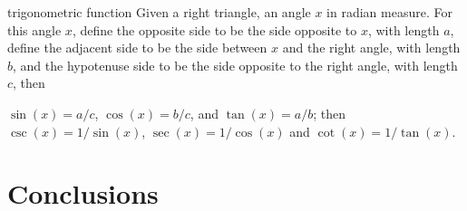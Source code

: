 \documentclass{article}
\begin{document}
\begin{myleftlinebox}
	trigonometric function
	\tcblower
	Given a right triangle, an angle $x$ in radian measure. For this angle $x$, define the opposite side to be the side opposite to $x$, with length $a$, define the adjacent side to be the side between $x$ and the right angle, with length $b$, and the hypotenuse side to be the side opposite to the right angle, with length $c$, then
	
	$\sin(x) = a/c$, $\cos(x)=b/c$, and $\tan(x) = a/b$; then $\csc(x)=1/\sin(x)$, $\sec(x)=1/\cos(x)$ and $\cot(x)=1/	\tan(x)$.
	\begin{center}
	\end{center}
\end{myleftlinebox}


\section{Conclusions}
\end{document}
